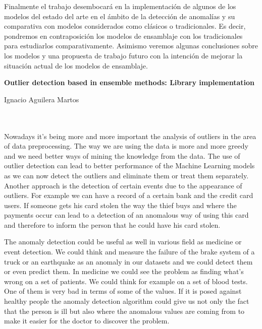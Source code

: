 Finalmente el trabajo desembocará en la implementación de algunos de los modelos del estado del arte en el ámbito de la detección de anomalías y su comparativa con modelos considerados como clásicos o tradicionales. Es decir, pondremos en contraposición los modelos de ensamblaje con los tradicionales para estudiarlos comparativamente. Asimismo veremos algunas conclusiones sobre los modelos y una propuesta de trabajo futuro con la intención de mejorar la situación actual de los modelos de ensamblaje.

\cleardoublepage


\thispagestyle{empty}


\begin{center}
{\large\bfseries Outlier detection based in ensemble methods: Library implementation}\\
\end{center}
\begin{center}
Ignacio Aguilera Martos\\
\end{center}

\\

\vspace{0.7cm}
\\

Nowadays it's being more and more important the analysis of outliers in the area of data preprocessing. The way we are using the data is more and more greedy and we need better ways of mining the knowledge from the data. The use of outlier detection can lead to better performance of the Machine Learning models as we can now detect the outliers and eliminate them or treat them separately. Another approach is the detection of certain events due to the appearance of outliers. For example we can have a record of a certain bank and the credit card users. If someone gets his card stolen the way the thief buys and where the payments occur can lead to a detection of an anomalous way of using this card and therefore to inform the person that he could have his card stolen.

The anomaly detection could be useful as well in various field as medicine or event detection. We could think and measure the failure of the brake system of a truck or an earthquake as an anomaly in our datasets and we could detect them or even predict them. In medicine we could see the problem as finding what's wrong on a set of patients. We could think for example on a set of blood tests. One of them is very bad in terms of some of the values. If it is posed against healthy people the anomaly detection algorithm could give us not only the fact that the person is ill but also where the anomalous values are coming from to make it easier for the doctor to discover the problem.

